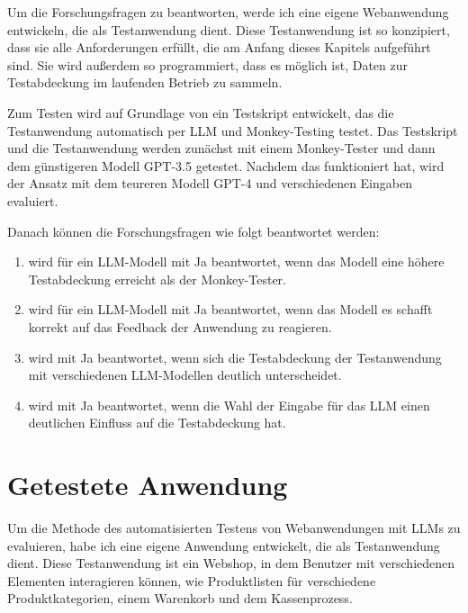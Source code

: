 
Um die Forschungsfragen zu beantworten, werde ich eine eigene Webanwendung entwickeln, die als Testanwendung dient.
Diese Testanwendung ist so konzipiert, dass sie alle Anforderungen erfüllt, die am Anfang dieses Kapitels aufgeführt sind.
Sie wird außerdem so programmiert, dass es möglich ist, Daten zur Testabdeckung im laufenden Betrieb zu sammeln.


Zum Testen wird auf Grundlage von  ein Testskript entwickelt, das die Testanwendung automatisch per LLM und Monkey-Testing testet.
Das Testskript und die Testanwendung werden zunächst mit einem Monkey-Tester und dann dem günstigeren Modell GPT-3.5 getestet.
Nachdem das funktioniert hat, wird der Ansatz mit dem teureren Modell GPT-4 und verschiedenen Eingaben evaluiert.

Danach können die Forschungsfragen wie folgt beantwortet werden:

\begin{enumerate}
    \item wird für ein LLM-Modell mit \glqq{}Ja\grqq{} beantwortet, wenn das Modell eine höhere Testabdeckung erreicht als der Monkey-Tester.
    \item wird für ein LLM-Modell mit \glqq{}Ja\grqq{} beantwortet, wenn das Modell es schafft korrekt auf das Feedback der Anwendung zu reagieren.
    \item wird mit \glqq{}Ja\grqq{} beantwortet, wenn sich die Testabdeckung der Testanwendung mit verschiedenen LLM-Modellen deutlich unterscheidet.
    \item wird mit \glqq{}Ja\grqq{} beantwortet, wenn die Wahl der Eingabe für das LLM einen deutlichen Einfluss auf die Testabdeckung hat.
\end{enumerate}



\section{Getestete Anwendung}

Um die Methode des automatisierten Testens von Webanwendungen mit LLMs zu evaluieren, habe ich eine eigene Anwendung entwickelt, die als Test\-an\-wen\-dung dient.
Diese Test\-anwendung ist ein Webshop, in dem Benutzer mit verschiedenen Elementen interagieren können, wie Produktlisten für verschiedene Produktkategorien, einem Warenkorb und dem Kassenprozess.

